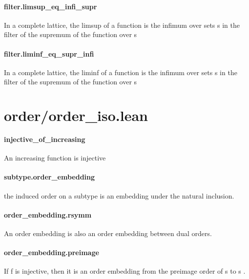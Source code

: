 \documentclass{article}
\begin{document}
\paragraph{filter.limsup\_eq\_infi\_supr}
\par
In a complete lattice, the limsup of a function is the infimum over sets 
\colorbox[RGB]{253,246,227}{{{{\color[RGB]{101, 123, 131} s }}}} in the filter
of the supremum of the function over 
\colorbox[RGB]{253,246,227}{{{{\color[RGB]{101, 123, 131} s }}}}\paragraph{filter.liminf\_eq\_supr\_infi}
\par
In a complete lattice, the liminf of a function is the infimum over sets 
\colorbox[RGB]{253,246,227}{{{{\color[RGB]{101, 123, 131} s }}}} in the filter
of the supremum of the function over 
\colorbox[RGB]{253,246,227}{{{{\color[RGB]{101, 123, 131} s }}}}\section{order/order\_iso.lean}\paragraph{injective\_of\_increasing}
\par
An increasing function is injective
\paragraph{subtype.order\_embedding}
\par
the induced order on a subtype is an embedding under the natural inclusion.
\paragraph{order\_embedding.rsymm}
\par
An order embedding is also an order embedding between dual orders.
\paragraph{order\_embedding.preimage}
\par
If 
\colorbox[RGB]{253,246,227}{{{{\color[RGB]{101, 123, 131} f }}}} is injective, then it is an order embedding from the
preimage order of 
\colorbox[RGB]{253,246,227}{{{{\color[RGB]{101, 123, 131} s }}}} to 
\colorbox[RGB]{253,246,227}{{{{\color[RGB]{101, 123, 131} s }}}}.
\end{document}

